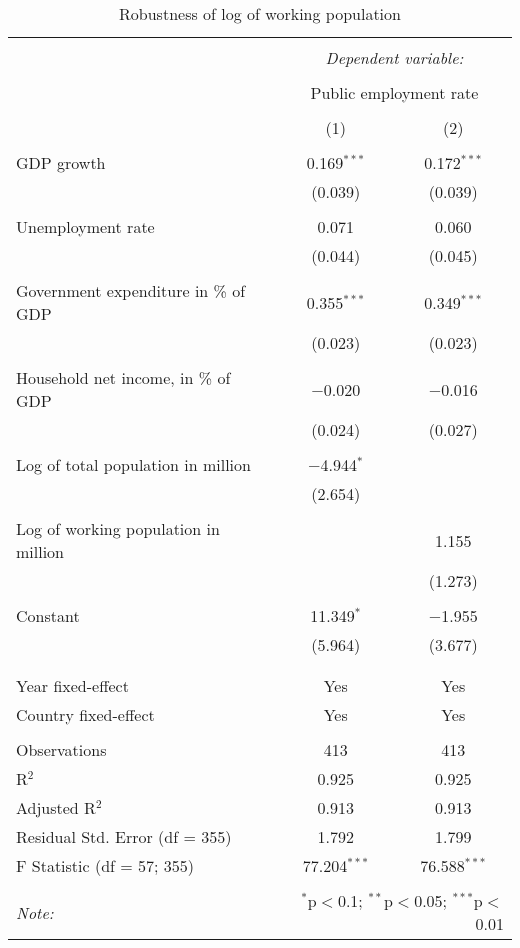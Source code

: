\begin{table}[!htbp] \centering
  \caption{Robustness of log of working population}
  \label{}
\begin{tabular}{@{\extracolsep{5pt}}lcc}
\\[-1.8ex]\hline
\hline \\[-1.8ex]
 & \multicolumn{2}{c}{\textit{Dependent variable:}} \\
\cline{2-3}
\\[-1.8ex] & \multicolumn{2}{c}{Public employment rate} \\
\\[-1.8ex] & (1) & (2)\\
\hline \\[-1.8ex]
 GDP growth & 0.169$^{***}$ & 0.172$^{***}$ \\
  & (0.039) & (0.039) \\
  & & \\
 Unemployment rate & 0.071 & 0.060 \\
  & (0.044) & (0.045) \\
  & & \\
 Government expenditure in \% of GDP & 0.355$^{***}$ & 0.349$^{***}$ \\
  & (0.023) & (0.023) \\
  & & \\
 Household net income, in \% of GDP & $-$0.020 & $-$0.016 \\
  & (0.024) & (0.027) \\
  & & \\
 Log of total population in million & $-$4.944$^{*}$ &  \\
  & (2.654) &  \\
  & & \\
 Log of working population in million &  & 1.155 \\
  &  & (1.273) \\
  & & \\
 Constant & 11.349$^{*}$ & $-$1.955 \\
  & (5.964) & (3.677) \\
  & & \\
\hline \\[-1.8ex]
Year fixed-effect & Yes & Yes \\
Country fixed-effect & Yes & Yes \\
\hline \\[-1.8ex]
Observations & 413 & 413 \\
R$^{2}$ & 0.925 & 0.925 \\
Adjusted R$^{2}$ & 0.913 & 0.913 \\
Residual Std. Error (df = 355) & 1.792 & 1.799 \\
F Statistic (df = 57; 355) & 77.204$^{***}$ & 76.588$^{***}$ \\
\hline
\hline \\[-1.8ex]
\textit{Note:}  & \multicolumn{2}{r}{$^{*}$p$<$0.1; $^{**}$p$<$0.05; $^{***}$p$<$0.01} \\
\end{tabular}
\end{table}
